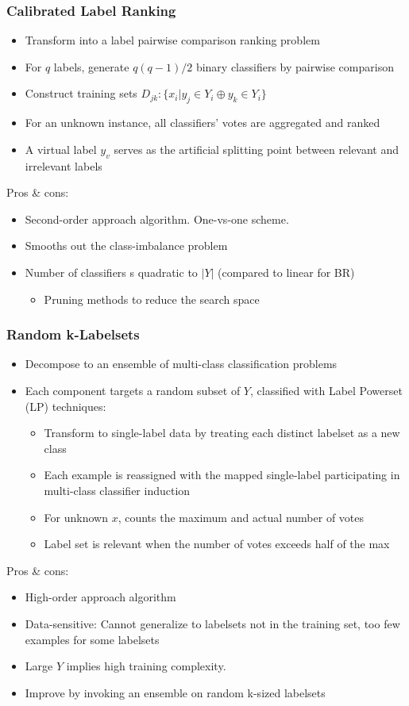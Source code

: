 \documentclass{beamer}
\begin{document}
\begin{frame}
\frametitle{Calibrated Label Ranking}
\begin{itemize}
	\item Transform into a label pairwise comparison ranking problem
	\item For $q$ labels, generate $q(q-1)/2$ binary classifiers by pairwise comparison
	\item Construct training sets $D_{jk} : \{x_i | y_j \in Y_i \oplus y_k \in Y_i\}$
	\item For an unknown instance, all classifiers' votes are aggregated and ranked 
	\item A virtual label $y_v$ serves as the artificial splitting point between relevant and irrelevant labels
\end{itemize}
Pros \& cons:
\begin{itemize}
	\item Second-order approach algorithm. One-vs-one scheme.
	\item Smooths out the class-imbalance problem
	\item Number of classifiers s quadratic to $|Y|$ (compared to linear for BR) 
	\begin{itemize}
		\item Pruning methods to reduce the search space 
	\end{itemize}
\end{itemize}
\end{frame}
\begin{frame}
\frametitle{Random k-Labelsets}
\begin{itemize}
	\item Decompose to an ensemble of multi-class classification problems
	\item Each component targets a random subset of $Y$, classified with Label Powerset (LP) techniques:
	\begin{itemize}
	\item Transform to single-label data by treating each distinct labelset as a new class
	\item Each example is reassigned with the mapped single-label participating in multi-class classifier induction
	\item For unknown $x$, counts the maximum and actual number of votes
	\item Label set is relevant when the number of votes exceeds half of the max
	\end{itemize}
\end{itemize}
Pros \& cons:
\begin{itemize}
	\item High-order approach algorithm
	\item Data-sensitive: Cannot generalize to labelsets not in the training set, too few examples for some labelsets
	\item Large $Y$ implies high training complexity.
	\item Improve by invoking an ensemble on random k-sized labelsets
\end{itemize}
\end{frame}
\end{document}
